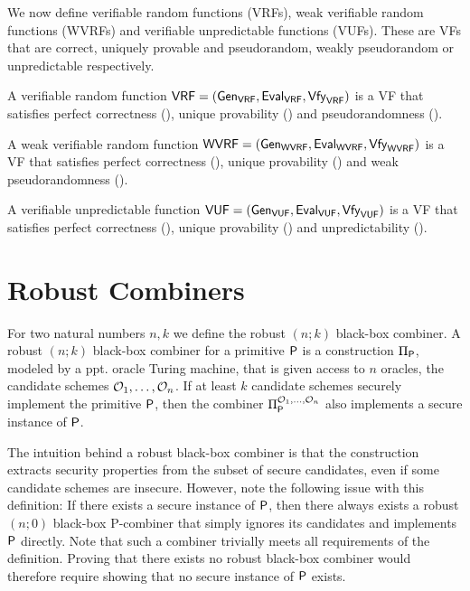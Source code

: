 We now define verifiable random functions (VRFs), weak verifiable random functions (WVRFs)
and verifiable unpredictable functions (VUFs). These are VFs that are correct, uniquely provable and pseudorandom,
weakly pseudorandom or unpredictable respectively.

\begin{definition}\label{def:vrf}
	A verifiable random function $\prim{VRF} = (\alg{Gen}{VRF}, \alg{Eval}{VRF}, \alg{Vfy}{VRF})$ is a VF that satisfies 
	perfect correctness (), unique provability () and pseudorandomness ().
\end{definition}

\begin{definition}\label{def:wvrf}
	A weak verifiable random function $\prim{WVRF} = (\alg{Gen}{WVRF}, \alg{Eval}{WVRF}, \alg{Vfy}{WVRF})$ is a VF that satisfies 
	perfect correctness (), unique provability () and weak pseudorandomness ().
\end{definition}

\begin{definition}\label{def:vuf}
	A verifiable unpredictable function $\prim{VUF} = (\alg{Gen}{VUF}, \alg{Eval}{VUF}, \alg{Vfy}{VUF})$ is a VF that satisfies 
	perfect correctness (), unique provability () and unpredictability ().
\end{definition}

\newpage

\section{Robust Combiners}
For two natural numbers $n,k$ we define the robust $(n;k)$ black-box combiner.
A robust $(n;k)$ black-box combiner for a primitive $ \textup{\textsf{P}} $ is a construction $\BBComb{P}$,
modeled by a ppt. oracle Turing machine, that is given access to $n$ oracles, the candidate schemes $\mathcal{O}_1, \ldots, \mathcal{O}_n$.
If at least $k$ candidate schemes securely implement the primitive $ \textup{\textsf{P}} $, then the combiner $\BBComb{P}[\O_1, \ldots, \O_n]$
also implements a secure instance of $ \textup{\textsf{P}} $.

The intuition behind a robust black-box combiner is that the construction extracts security properties from the 
subset of secure candidates, even if some candidate schemes are insecure. However, note the following issue with this definition:
If there exists a secure instance of $ \textup{\textsf{P}} $, then there always 
exists a robust $(n;0)$ black-box P-combiner that simply ignores its candidates and implements $ \textup{\textsf{P}} $ directly.
Note that such a combiner trivially meets all requirements of the definition.
Proving that there exists no robust black-box combiner would therefore require showing that no secure instance of 
$ \textup{\textsf{P}} $ exists. 

